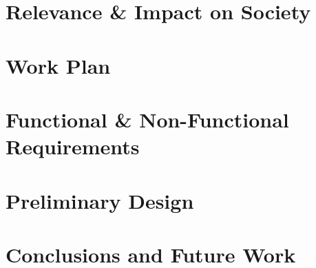 \documentclass[a4paper, oneside, 12pt]{report}
\begin{document}
\chapter{Relevance \& Impact on Society}

% 
\chapter{Work Plan}

% 

\chapter{Functional \& Non-Functional Requirements}


\chapter{Preliminary Design}

 
\chapter{Conclusions and Future Work}


\clearpage
{}


\end{document}
